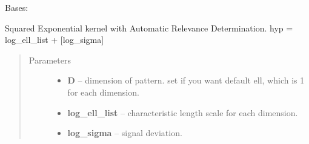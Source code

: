 \documentclass[letterpaper,10pt,english]{sphinxmanual}
\begin{document}
\begin{fulllineitems}
\label{pyGPs.Core:pyGPs.Core.cov.RBFard}
Bases: {\hyperref[pyGPs.Core:pyGPs.Core.cov.Kernel]{}}

Squared Exponential kernel with Automatic Relevance Determination.
hyp = log\_ell\_list + {[}log\_sigma{]}
\begin{quote}\begin{description}
\item[{Parameters}] \leavevmode\begin{itemize}
\item {} 
\textbf{D} -- dimension of pattern. set if you want default ell, which is 1 for each dimension.

\item {} 
\textbf{log\_ell\_list} -- characteristic length scale for each dimension.

\item {} 
\textbf{log\_sigma} -- signal deviation.

\end{itemize}

\end{description}\end{quote}

\begin{fulllineitems}
\label{pyGPs.Core:pyGPs.Core.cov.RBFard.getCovMatrix}
\end{fulllineitems}


\begin{fulllineitems}
\label{pyGPs.Core:pyGPs.Core.cov.RBFard.getDerMatrix}
\end{fulllineitems}


\end{fulllineitems}

\end{document}
